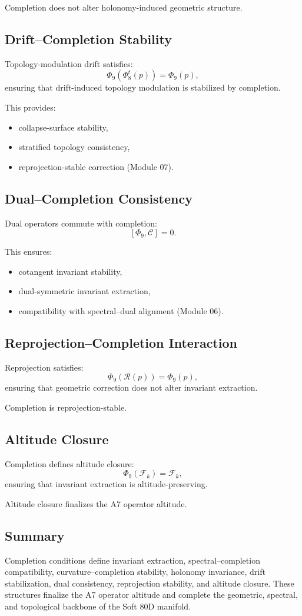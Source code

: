 Completion does not alter holonomy-induced geometric structure.

\subsection{Drift–Completion Stability}
Topology-modulation drift satisfies:
\[
\Phi_9(\Phi_8^t(p)) = \Phi_9(p),
\]
ensuring that drift-induced topology modulation is stabilized by completion.

This provides:
\begin{itemize}
    \item collapse-surface stability,
    \item stratified topology consistency,
    \item reprojection-stable correction (Module 07).
\end{itemize}

\subsection{Dual–Completion Consistency}
Dual operators commute with completion:
\[
[\Phi_9, \mathcal{C}] = 0.
\]

This ensures:
\begin{itemize}
    \item cotangent invariant stability,
    \item dual-symmetric invariant extraction,
    \item compatibility with spectral–dual alignment (Module 06).
\end{itemize}

\subsection{Reprojection–Completion Interaction}
Reprojection satisfies:
\[
\Phi_9(\mathcal{R}(p)) = \Phi_9(p),
\]
ensuring that geometric correction does not alter invariant extraction.

Completion is reprojection-stable.

\subsection{Altitude Closure}
Completion defines altitude closure:
\[
\Phi_9(\mathcal{F}_k) = \mathcal{F}_k,
\]
ensuring that invariant extraction is altitude-preserving.

Altitude closure finalizes the A7 operator altitude.

\subsection{Summary}
Completion conditions define invariant extraction, spectral–completion
compatibility, curvature–completion stability, holonomy invariance,
drift stabilization, dual consistency, reprojection stability, and altitude
closure. These structures finalize the A7 operator altitude and complete the
geometric, spectral, and topological backbone of the Soft 80D manifold.

